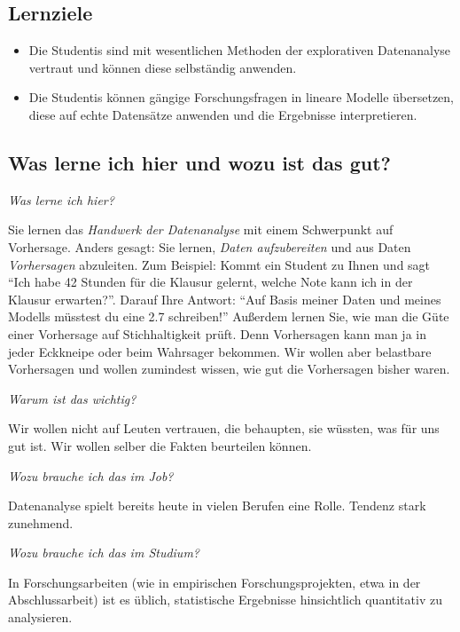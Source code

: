 \documentclass[
  letterpaper,
  twoside,
  open=any]{scrbook}
\theoremstyle{definition}
\theoremstyle{definition}
\theoremstyle{definition}
\theoremstyle{remark}
\begin{document}
\subsection{Lernziele}\label{lernziele}

\begin{itemize}
\item
  Die Studentis sind mit wesentlichen Methoden der explorativen
  Datenanalyse vertraut und können diese selbständig anwenden.
\item
  Die Studentis können gängige Forschungsfragen in lineare Modelle
  übersetzen, diese auf echte Datensätze anwenden und die Ergebnisse
  interpretieren.
\end{itemize}

\subsection{Was lerne ich hier und wozu ist das
gut?}\label{was-lerne-ich-hier-und-wozu-ist-das-gut}

\emph{Was lerne ich hier?}

Sie lernen das \emph{Handwerk der Datenanalyse} mit einem Schwerpunkt
auf Vorhersage. Anders gesagt: Sie lernen, \emph{Daten aufzubereiten}
und aus Daten \emph{Vorhersagen} abzuleiten. Zum Beispiel: Kommt ein
Student zu Ihnen und sagt \enquote{Ich habe 42 Stunden für die Klausur
gelernt, welche Note kann ich in der Klausur erwarten?}. Darauf Ihre
Antwort: \enquote{Auf Basis meiner Daten und meines Modells müsstest du
eine 2.7 schreiben!} Außerdem lernen Sie, wie man die Güte einer
Vorhersage auf Stichhaltigkeit prüft. Denn Vorhersagen kann man ja in
jeder Eckkneipe oder beim Wahrsager bekommen. Wir wollen aber belastbare
Vorhersagen und wollen zumindest wissen, wie gut die Vorhersagen bisher
waren.

\emph{Warum ist das wichtig?}

Wir wollen nicht auf Leuten vertrauen, die behaupten, sie wüssten, was
für uns gut ist. Wir wollen selber die Fakten beurteilen können.

\emph{Wozu brauche ich das im Job?}

Datenanalyse spielt bereits heute in vielen Berufen eine Rolle. Tendenz
stark zunehmend.

\emph{Wozu brauche ich das im Studium?}

In Forschungsarbeiten (wie in empirischen Forschungsprojekten, etwa in
der Abschlussarbeit) ist es üblich, statistische Ergebnisse hinsichtlich
quantitativ zu analysieren.
\end{document}
